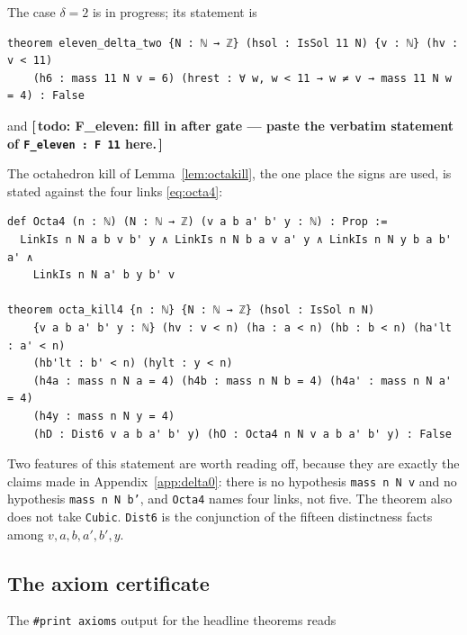 \documentclass[11pt,reqno]{amsart}
\theoremstyle{plain}
\theoremstyle{definition}
\numberwithin{theorem}{section}
\newcommand{\todo}[1]{\textup{\textbf{[\,todo: #1\,]}}}
\newif\ifleandone
\begin{document}
\ifleandone
The case $\delta = 2$ and the assembly are
\begin{Verbatim}[fontsize=\footnotesize,formatcom=\ttfamily,samepage=false]
theorem eleven_delta_two {N : ℕ → ℤ} (hsol : IsSol 11 N) {v : ℕ} (hv : v < 11)
    (h6 : mass 11 N v = 6) (hrest : ∀ w, w < 11 → w ≠ v → mass 11 N w = 4) : False

theorem F_eleven : F 11
\end{Verbatim}
\else
The case $\delta = 2$ is in progress; its statement is
\begin{Verbatim}[fontsize=\footnotesize,formatcom=\ttfamily,samepage=false]
theorem eleven_delta_two {N : ℕ → ℤ} (hsol : IsSol 11 N) {v : ℕ} (hv : v < 11)
    (h6 : mass 11 N v = 6) (hrest : ∀ w, w < 11 → w ≠ v → mass 11 N w = 4) : False
\end{Verbatim}
and \todo{F\_eleven: fill in after gate --- paste the verbatim statement of
\texttt{F\_eleven : F 11} here.}
\fi

The octahedron kill of Lemma~\ref{lem:octakill}, the one place the signs are used, is stated
against the four links \eqref{eq:octa4}:

\begin{Verbatim}[fontsize=\footnotesize,formatcom=\ttfamily,samepage=false]
def Octa4 (n : ℕ) (N : ℕ → ℤ) (v a b a' b' y : ℕ) : Prop :=
  LinkIs n N a b v b' y ∧ LinkIs n N b a v a' y ∧ LinkIs n N y b a b' a' ∧
    LinkIs n N a' b y b' v

theorem octa_kill4 {n : ℕ} {N : ℕ → ℤ} (hsol : IsSol n N)
    {v a b a' b' y : ℕ} (hv : v < n) (ha : a < n) (hb : b < n) (ha'lt : a' < n)
    (hb'lt : b' < n) (hylt : y < n)
    (h4a : mass n N a = 4) (h4b : mass n N b = 4) (h4a' : mass n N a' = 4)
    (h4y : mass n N y = 4)
    (hD : Dist6 v a b a' b' y) (hO : Octa4 n N v a b a' b' y) : False
\end{Verbatim}

Two features of this statement are worth reading off, because they are exactly the claims made
in Appendix~\ref{app:delta0}: there is no hypothesis \texttt{mass n N v} and no hypothesis
\texttt{mass n N b'}, and \texttt{Octa4} names four links, not five. The theorem also does not
take \texttt{Cubic}. \texttt{Dist6} is the conjunction of the fifteen distinctness facts among
$v, a, b, a', b', y$.

\subsection{The axiom certificate}
The \texttt{\#print axioms} output for the headline theorems reads
\end{document}
